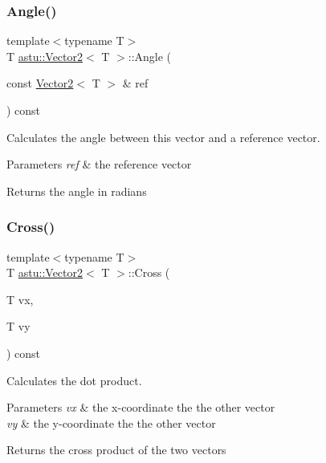 \subsubsection{\texorpdfstring{Angle()}{Angle()}}
{\footnotesize\ttfamily template$<$typename T$>$ \\
T \hyperlink{classastu_1_1Vector2}{astu\+::\+Vector2}$<$ T $>$\+::Angle (\begin{DoxyParamCaption}\item[{const \hyperlink{classastu_1_1Vector2}{Vector2}$<$ T $>$ \&}]{ref }\end{DoxyParamCaption}) const\hspace{0.3cm}{\ttfamily [inline]}}

Calculates the angle between this vector and a reference vector.


\begin{DoxyParams}{Parameters}
{\em ref} & the reference vector \\
\hline
\end{DoxyParams}
\begin{DoxyReturn}{Returns}
the angle in radians 
\end{DoxyReturn}
\mbox{\label{classastu_1_1Vector2_ad7245590bd3a503f0c388cad9008789b}} 
\subsubsection{\texorpdfstring{Cross()}{Cross()}\hspace{0.1cm}{\footnotesize\ttfamily [1/2]}}
{\footnotesize\ttfamily template$<$typename T$>$ \\
T \hyperlink{classastu_1_1Vector2}{astu\+::\+Vector2}$<$ T $>$\+::Cross (\begin{DoxyParamCaption}\item[{T}]{vx,  }\item[{T}]{vy }\end{DoxyParamCaption}) const\hspace{0.3cm}{\ttfamily [inline]}}

Calculates the dot product.


\begin{DoxyParams}{Parameters}
{\em vx} & the x-\/coordinate the the other vector \\
\hline
{\em vy} & the y-\/coordinate the the other vector \\
\hline
\end{DoxyParams}
\begin{DoxyReturn}{Returns}
the cross product of the two vectors 
\end{DoxyReturn}
\mbox{\label{classastu_1_1Vector2_ab39f342813a6f5f21a533a4345e1336c}} 
